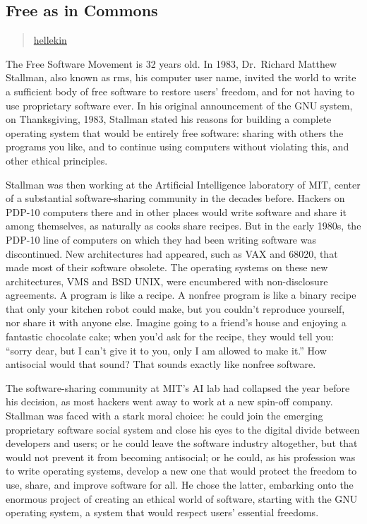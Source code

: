 \subsection{Free as in Commons}\label{free-as-in-commons}

\begin{quote}
\href{../appendix/attributions.html\#hellekin}{hellekin}
\end{quote}

The Free Software Movement is 32 years old. In 1983, Dr.~Richard Matthew
Stallman, also known as rms, his computer user name, invited the world
to write a sufficient body of free software to restore users' freedom,
and for not having to use proprietary software ever. In his original
announcement of the GNU system, on Thanksgiving, 1983, Stallman stated
his reasons for building a complete operating system that would be
entirely free software: sharing with others the programs you like, and
to continue using computers without violating this, and other ethical
principles.

Stallman was then working at the Artificial Intelligence laboratory of
MIT, center of a substantial software-sharing community in the decades
before. Hackers on PDP-10 computers there and in other places would
write software and share it among themselves, as naturally as cooks
share recipes. But in the early 1980s, the PDP-10 line of computers on
which they had been writing software was discontinued. New architectures
had appeared, such as VAX and 68020, that made most of their software
obsolete. The operating systems on these new architectures, VMS and BSD
UNIX, were encumbered with non-disclosure agreements. A program is like
a recipe. A nonfree program is like a binary recipe that only your
kitchen robot could make, but you couldn't reproduce yourself, nor share
it with anyone else. Imagine going to a friend's house and enjoying a
fantastic chocolate cake; when you'd ask for the recipe, they would tell
you: ``sorry dear, but I can't give it to you, only I am allowed to make
it.'' How antisocial would that sound? That sounds exactly like nonfree
software.

The software-sharing community at MIT's AI lab had collapsed the year
before his decision, as most hackers went away to work at a new spin-off
company. Stallman was faced with a stark moral choice: he could join the
emerging proprietary software social system and close his eyes to the
digital divide between developers and users; or he could leave the
software industry altogether, but that would not prevent it from
becoming antisocial; or he could, as his profession was to write
operating systems, develop a new one that would protect the freedom to
use, share, and improve software for all. He chose the latter, embarking
onto the enormous project of creating an ethical world of software,
starting with the GNU operating system, a system that would respect
users' essential freedoms.


